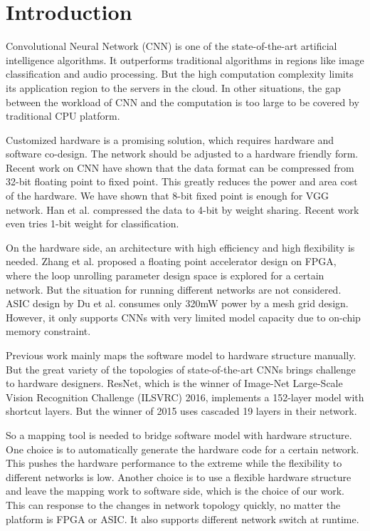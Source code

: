 \documentclass[10pt, conference, compsocconf]{IEEEtran}
\begin{document}
\section{Introduction}
Convolutional Neural Network (CNN) is one of the state-of-the-art artificial intelligence algorithms. It outperforms traditional algorithms in regions like image classification and audio processing. But the high computation complexity limits its application region to the servers in the cloud. In other situations, the gap between the workload of CNN and the computation is too large to be covered by traditional CPU platform.

Customized hardware is a promising solution, which requires hardware and software co-design. The network should be adjusted to a hardware friendly form. Recent work on CNN have shown that the data format can be compressed from 32-bit floating point to fixed point. This greatly reduces the power and area cost of the hardware. We have shown that 8-bit fixed point is enough for VGG network\cite{simonyan2014very}. Han et al.\cite{han2015learning} compressed the data to 4-bit by weight sharing. Recent work even tries 1-bit weight for classification\cite{Rastegari2016XNOR}.

On the hardware side, an architecture with high efficiency and high flexibility is needed. Zhang et al.\cite{zhang2015optimizing} proposed a floating point accelerator design on FPGA, where the loop unrolling parameter design space is explored for a certain network. But the situation for running different networks are not considered. ASIC design by Du et al.\cite{du2015shidiannao} consumes only 320mW power by a mesh grid design. However, it only supports CNNs with very limited model capacity due to on-chip memory constraint.

Previous work mainly maps the software model to hardware structure manually. But the great variety of the topologies of state-of-the-art CNNs brings challenge to hardware designers. ResNet\cite{he2015deep}, which is the winner of Image-Net Large-Scale Vision Recognition Challenge (ILSVRC) 2016, implements a 152-layer model with shortcut layers. But the winner of 2015\cite{simonyan2014very} uses cascaded 19 layers in their network.

So a mapping tool is needed to bridge software model with hardware structure. One choice is to automatically generate the hardware code for a certain network. This pushes the hardware performance to the extreme while the flexibility to different networks is low. Another choice is to use a flexible hardware structure and leave the mapping work to software side, which is the choice of our work. This can response to the changes in network topology quickly, no matter the platform is FPGA or ASIC. It also supports different network switch at runtime.
\end{document}
